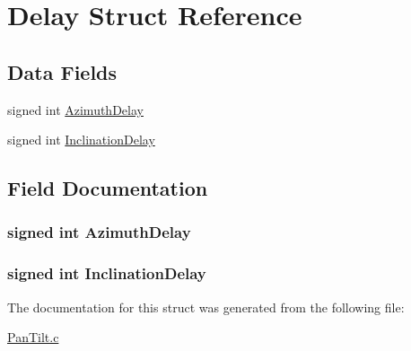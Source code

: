 \hypertarget{struct_delay}{\section{Delay Struct Reference}
\label{struct_delay}
}
\subsection*{Data Fields}
\begin{DoxyCompactItemize}
\item 
signed int \hyperlink{struct_delay_aacc83952fc6c5812597bc96d622f5317}{Azimuth\+Delay}
\item 
signed int \hyperlink{struct_delay_a4f5b10a6a07a4aaed02134ab2691b8ec}{Inclination\+Delay}
\end{DoxyCompactItemize}


\subsection{Field Documentation}
\hypertarget{struct_delay_aacc83952fc6c5812597bc96d622f5317}{
\subsubsection[{Azimuth\+Delay}]{\setlength{\rightskip}{0pt plus 5cm}signed int Azimuth\+Delay}}\label{struct_delay_aacc83952fc6c5812597bc96d622f5317}
\hypertarget{struct_delay_a4f5b10a6a07a4aaed02134ab2691b8ec}{
\subsubsection[{Inclination\+Delay}]{\setlength{\rightskip}{0pt plus 5cm}signed int Inclination\+Delay}}\label{struct_delay_a4f5b10a6a07a4aaed02134ab2691b8ec}


The documentation for this struct was generated from the following file\+:\begin{DoxyCompactItemize}
\item 
\hyperlink{_pan_tilt_8c}{Pan\+Tilt.\+c}\end{DoxyCompactItemize}

